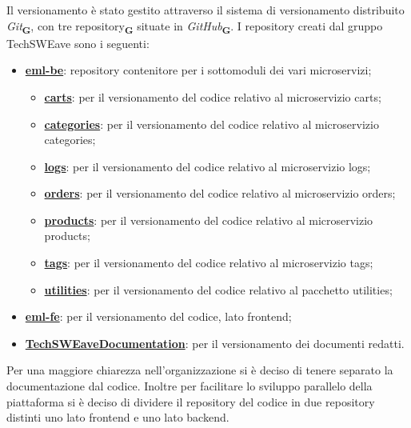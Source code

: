 Il versionamento è stato gestito attraverso il sistema di versionamento distribuito \textit{Git}\textsubscript{\textbf{G}}, con tre repository\textsubscript{\textbf{G}} situate in \textit{GitHub}\textsubscript{\textbf{G}}.
I repository creati dal gruppo TechSWEave sono i seguenti:
\begin{itemize}
    \item \textbf{\href{https://github.com/techsweave/eml-be.git}{eml-be}}: repository contenitore per i sottomoduli dei vari microservizi;
          \begin{itemize}
              \item \textbf{\href{https://github.com/techsweave/logs.git}{carts}}: per il versionamento del codice relativo al microservizio carts;
              \item \textbf{\href{https://github.com/techsweave/logs.git}{categories}}: per il versionamento del codice relativo al microservizio categories;
              \item \textbf{\href{https://github.com/techsweave/logs.git}{logs}}: per il versionamento del codice relativo al microservizio logs;
              \item \textbf{\href{https://github.com/techsweave/products.git}{orders}}: per il versionamento del codice relativo al microservizio orders;
              \item \textbf{\href{https://github.com/techsweave/products.git}{products}}: per il versionamento del codice relativo al microservizio products;
              \item \textbf{\href{https://github.com/techsweave/products.git}{tags}}: per il versionamento del codice relativo al microservizio tags;
              \item \textbf{\href{https://github.com/techsweave/products.git}{utilities}}: per il versionamento del codice relativo al pacchetto utilities;
          \end{itemize}
    \item \textbf{\href{https://github.com/techsweave/eml-fe.git}{eml-fe}}: per il versionamento del codice, lato frontend;
    \item \textbf{\href{https://github.com/techsweave/TechSWEaveDocumentation.git}{TechSWEaveDocumentation}}: per il versionamento dei documenti redatti.
\end{itemize}
Per una maggiore chiarezza nell'organizzazione si è deciso di tenere separato la documentazione dal codice. Inoltre per facilitare lo sviluppo parallelo della piattaforma si è deciso di dividere il repository del codice in due repository distinti uno lato frontend e uno lato backend.
